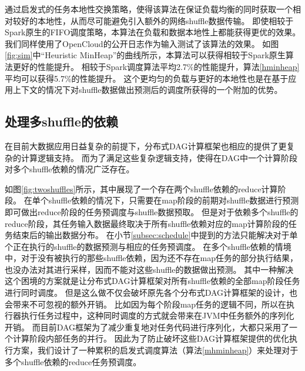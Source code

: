 通过启发式的任务本地性交换策略，使得该算法在保证负载均衡的同时获取一个相对较好的本地性，从而尽可能避免引入额外的网络shuffle数据传输。
即使相较于Spark原生的FIFO调度策略\cite{sparksource}，本算法在负载和数据本地性上都能获得更优的效果。
我们同样使用了OpenCloud的公开日志作为输入测试了该算法的效果。
如图\ref{fig:sim}中“Heuristic MinHeap”的曲线所示，本算法可以获得相较于Spark原生算法更好的性能提升。
相较于Spark调度算法平均2.7\%的性能提升，算法\ref{hminheap}平均可以获得5.7\%的性能提升。
这个更均匀的负载与更好的本地性也是在基于应用上下文的情况下对shuffle数据做出预测后的调度所获得的一个附加的优势。

\subsection{处理多shuffle的依赖}

在目前大数据应用日益复杂的前提下，分布式DAG计算框架也相应的提供了更复杂的计算逻辑支持。
而为了满足这些复杂逻辑支持，使得在DAG中一个计算阶段对多个shuffle依赖的情况广泛存在。

如图\ref{fig:twoshuffles}所示，其中展现了一个存在两个shuffle依赖的reduce计算阶段。
在单个shuffle依赖的情况下，只需要在map阶段的前期对shuffle数据进行预测即可做出reduce阶段的任务预调度与shuffle数据预取。
但是对于依赖多个shuffle的reduce阶段，其任务输入数据最终取决于所有shuffle依赖对应的map计算阶段的任务结束后的输出数据分布。
在小节\ref{subsec:schedule}中提到的方法只能解决对于单个正在执行的shuffle的数据预测与相应的任务预调度。
在多个shuffle依赖的情境中，对于没有被执行的那些shuffle依赖，因为还不存在map任务的部分执行结果，也没办法对其进行采样，因而不能对这些shuffle的数据做出预测。
其中一种解决这个困境的方案就是让分布式DAG计算框架对所有shuffle依赖的全部map阶段任务进行同时调度。
但是这么做不仅会破坏原先各个分布式DAG计算框架的设计，也会带来不可忽视的额外开销。
比如因为每个阶段map任务的逻辑不同，所以在执行器执行任务过程中，这种同时调度的方式就会带来在JVM中任务额外的序列化开销。
而目前DAG框架为了减少重复地对任务代码进行序列化，大都只采用了一个计算阶段内部任务的并行。
因此为了防止破坏这些DAG计算框架提供的优化执行方案，我们设计了一种累积的启发式调度算法（算法\ref{mhminheap}）来处理对于多个shuffle依赖的reduce任务预调度。

